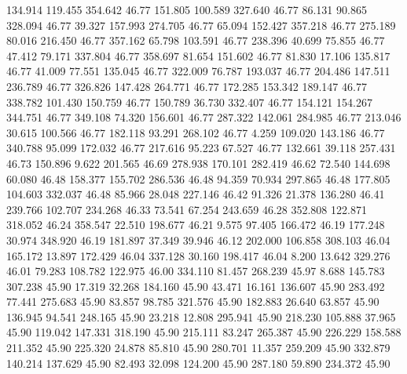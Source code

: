  134.914  119.455  354.642        46.77
 151.805  100.589  327.640        46.77
  86.131   90.865  328.094        46.77
  39.327  157.993  274.705        46.77
  65.094  152.427  357.218        46.77
 275.189   80.016  216.450        46.77
 357.162   65.798  103.591        46.77
 238.396   40.699   75.855        46.77
  47.412   79.171  337.804        46.77
 358.697   81.654  151.602        46.77
  81.830   17.106  135.817        46.77
  41.009   77.551  135.045        46.77
 322.009   76.787  193.037        46.77
 204.486  147.511  236.789        46.77
 326.826  147.428  264.771        46.77
 172.285  153.342  189.147        46.77
 338.782  101.430  150.759        46.77
 150.789   36.730  332.407        46.77
 154.121  154.267  344.751        46.77
 349.108   74.320  156.601        46.77
 287.322  142.061  284.985        46.77
 213.046   30.615  100.566        46.77
 182.118   93.291  268.102        46.77
   4.259  109.020  143.186        46.77
 340.788   95.099  172.032        46.77
 217.616   95.223   67.527        46.77
 132.661   39.118  257.431        46.73
 150.896    9.622  201.565        46.69
 278.938  170.101  282.419        46.62
  72.540  144.698   60.080        46.48
 158.377  155.702  286.536        46.48
  94.359   70.934  297.865        46.48
 177.805  104.603  332.037        46.48
  85.966   28.048  227.146        46.42
  91.326   21.378  136.280        46.41
 239.766  102.707  234.268        46.33
  73.541   67.254  243.659        46.28
 352.808  122.871  318.052        46.24
 358.547   22.510  198.677        46.21
   9.575   97.405  166.472        46.19
 177.248   30.974  348.920        46.19
 181.897   37.349   39.946        46.12
 202.000  106.858  308.103        46.04
 165.172   13.897  172.429        46.04
 337.128   30.160  198.417        46.04
   8.200   13.642  329.276        46.01
  79.283  108.782  122.975        46.00
 334.110   81.457  268.239        45.97
   8.688  145.783  307.238        45.90
  17.319   32.268  184.160        45.90
  43.471   16.161  136.607        45.90
 283.492   77.441  275.683        45.90
  83.857   98.785  321.576        45.90
 182.883   26.640   63.857        45.90
 136.945   94.541  248.165        45.90
  23.218   12.808  295.941        45.90
 218.230  105.888   37.965        45.90
 119.042  147.331  318.190        45.90
 215.111   83.247  265.387        45.90
 226.229  158.588  211.352        45.90
 225.320   24.878   85.810        45.90
 280.701   11.357  259.209        45.90
 332.879  140.214  137.629        45.90
  82.493   32.098  124.200        45.90
 287.180   59.890  234.372        45.90
